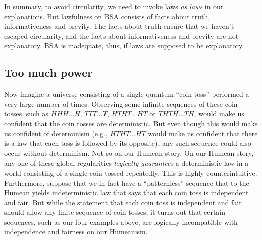 In summary, to avoid circularity, we need to invoke laws \textit{as laws} in our explanations. But lawfulness on BSA consists
of facts about truth, informativeness and brevity. The facts about truth ensure that we haven't escaped circularity, and the
facts about informativeness and brevity are not explanatory. BSA is inadequate, thus, if laws are supposed to be explanatory.

\subsection{Too much power}
Now imagine a universe consisting of a single quantum ``coin toss'' performed a very large number of times. Observing some 
infinite sequences of these coin tosses, such as $HHH...H$, $TTT...T$, $HTHT...HT$ or $THTH...TH$, would make us confident 
that the coin tosses are deterministic. But even though this would make us confident of determinism (e.g., $HTHT...HT$
would make us confident that there is a law that each toss is followed by its opposite), any such sequence could also
occur without determinism. Not so on our Humean story. On our Humean story, any one of these global regularities \textit{logically 
guarantees} a deterministic law in a world consisting of a single coin tossed repeatedly. This is highly counterintuitive. 
Furthermore, suppose that we in fact have a ``patternless'' sequence that to the Humean yields indeterministic law that says 
that each coin toss is independent and fair. But while the statement that each coin toss is independent and fair should allow any 
finite sequence of coin tosses, it turns out that certain sequences, such as our four examples above, are logically incompatible with 
independence and fairness on our Humeanism.

